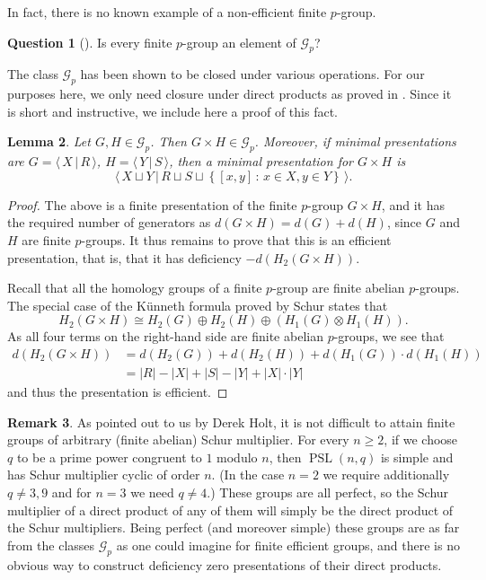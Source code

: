 \documentclass[a4paper,12pt]{amsart}
\theoremstyle{plain}
\newtheorem{lem}{Lemma}
\theoremstyle{definition}
\newtheorem{qn}[lem]{Question}
\newtheorem{rmk}[lem]{Remark}
\newcommand{\Gp}{\mathcal{G}_p}
\newcommand{\colonset}[2]{\left\{ #1 \, : \, #2 \right\}}
\newcommand{\gp}[2]{\langle \, #1 \, | \, #2 \, \rangle}
\begin{document}
In fact, there is no known example of a non-efficient finite $p$-group.
\begin{qn}[{\cite[Question 18]{mann:questions}}]
    Is every finite $p$-group an element of $\mathcal{G}_p$?
\end{qn}

The class $\Gp$ has been shown to be closed under various operations.
For our purposes here, we only need closure under direct products as proved in \cite{johnson}.
Since it is short and instructive, we include here a proof of this fact.

\begin{lem}
    Let $G, H \in \Gp$.
    Then $G \times H \in \Gp$.
    Moreover, if minimal presentations are $G = \gp{X}{R}$, $H = \gp{Y}{S}$, then a minimal presentation for $G \times H$ is \[
        \gp{X \sqcup Y}{R \sqcup S \sqcup \colonset{[x,y]}{x \in X, y \in Y}}.
    \]
\end{lem}

\begin{proof}
    The above is a finite presentation of the finite $p$-group $G \times H$, and it has the required number of generators as $d(G \times H) = d(G) + d(H)$, since $G$ and $H$ are finite $p$-groups.
    It thus remains to prove that this is an efficient presentation, that is, that it has deficiency $-d(H_2(G \times H))$.

    Recall that all the homology groups of a finite $p$-group are finite abelian $p$-groups.
    The special case of the Künneth formula proved by Schur states that \[
        H_2(G \times H) \cong H_2(G) \oplus H_2(H) \oplus (H_1(G) \otimes H_1(H)).
    \]
    As all four terms on the right-hand side are finite abelian $p$-groups, we see that
    \begin{align*}
        d(H_2(G \times H)) &= d(H_2(G)) + d(H_2(H)) + d(H_1(G)) \cdot d(H_1(H)) \\
                           &= |R| - |X| + |S| - |Y| + |X| \cdot |Y|
    \end{align*}
    and thus the presentation is efficient.
\end{proof}

\begin{collectors}
\begin{rmk}
    As pointed out to us by Derek Holt, it is not difficult to attain finite groups of arbitrary (finite abelian) Schur multiplier.
    For every $n \geq 2$, if we choose $q$ to be a prime power congruent to $1$ modulo $n$, then $\operatorname{PSL}(n, q)$ is simple and has Schur multiplier cyclic of order $n$.
    (In the case $n = 2$ we require additionally $q \neq 3,9$ and for $n = 3$ we need $q \neq 4$.)
    These groups are all perfect, so the Schur multiplier of a direct product of any of them will simply be the direct product of the Schur multipliers.
    Being perfect (and moreover simple) these groups are as far from the classes $\Gp$ as one could imagine for finite efficient groups, and there is no obvious way to construct deficiency zero presentations of their direct products.
\end{rmk}
\end{collectors}
\end{document}
